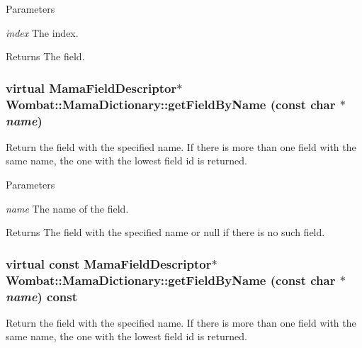 \begin{DoxyParams}{Parameters}
\item[{\em index}]The index. \end{DoxyParams}
\begin{DoxyReturn}{Returns}
The field. 
\end{DoxyReturn}
\hypertarget{classWombat_1_1MamaDictionary_a3b99774008d6b4d7e36832a34ef7f8d8}{
\subsubsection[{getFieldByName}]{\setlength{\rightskip}{0pt plus 5cm}virtual {\bf MamaFieldDescriptor}$\ast$ Wombat::MamaDictionary::getFieldByName (const char $\ast$ {\em name})}}
\label{classWombat_1_1MamaDictionary_a3b99774008d6b4d7e36832a34ef7f8d8}


Return the field with the specified name. If there is more than one field with the same name, the one with the lowest field id is returned.


\begin{DoxyParams}{Parameters}
\item[{\em name}]The name of the field. \end{DoxyParams}
\begin{DoxyReturn}{Returns}
The field with the specified name or null if there is no such field. 
\end{DoxyReturn}
\hypertarget{classWombat_1_1MamaDictionary_a6ee544d8144978bf2e49a1962dea9026}{
\subsubsection[{getFieldByName}]{\setlength{\rightskip}{0pt plus 5cm}virtual const {\bf MamaFieldDescriptor}$\ast$ Wombat::MamaDictionary::getFieldByName (const char $\ast$ {\em name}) const}}
\label{classWombat_1_1MamaDictionary_a6ee544d8144978bf2e49a1962dea9026}


Return the field with the specified name. If there is more than one field with the same name, the one with the lowest field id is returned.


